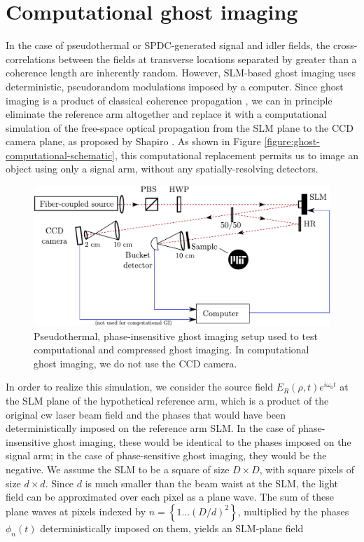 \section{Computational ghost imaging}

In the case of pseudothermal or SPDC-generated signal and idler fields, the cross-correlations between the fields at transverse locations separated by greater than a coherence length are inherently random. However, SLM-based ghost imaging uses deterministic, pseudorandom modulations imposed by a computer. Since ghost imaging is a product of classical coherence propagation \cite{erkmen-unified}, we can in principle eliminate the reference arm altogether and replace it with a computational simulation of the free-space optical propagation from the SLM plane to the CCD camera plane, as proposed by Shapiro \cite{shapiro-computational,erkmen-from}. As shown in Figure \ref{figure:ghost-computational-schematic}, this computational replacement permits us to image an object using only a signal arm, without any spatially-resolving detectors.

\begin{figure}[t]
\begin{center}
\includegraphics[width=13cm]{figure-ghost-computational-setup.pdf}
\caption{Pseudothermal, phase-insensitive ghost imaging setup used to test computational and compressed ghost imaging. In computational ghost imaging, we do not use the CCD camera.}
\label{figure:ghost-computational-setup}
\end{center}
\end{figure}

In order to realize this simulation, we consider the source field $E_R(\rho, t)e^{i\omega_0 t}$ at the SLM plane of the hypothetical reference arm, which is a product of the original cw laser beam field and the phases that would have been deterministically imposed on the reference arm SLM. In the case of phase-insensitive ghost imaging, these would be identical to the phases imposed on the signal arm; in the case of phase-sensitive ghost imaging, they would be the negative. We assume the SLM to be a square of size $D \times D$, with square pixels of size $d \times d$. Since $d$ is much smaller than the beam waist at the SLM, the light field can be approximated over each pixel as a plane wave. The sum of these plane waves at pixels indexed by $n = \left\{1 ... (D/d)^2\right\}$, multiplied by the phases $\phi_n(t)$ deterministically imposed on them, yields an SLM-plane field

